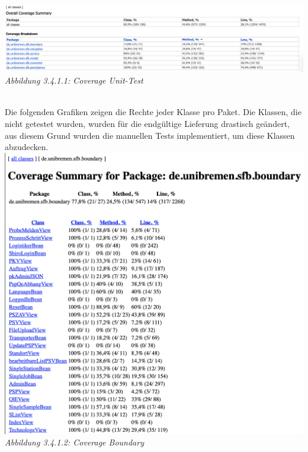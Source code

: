 \documentclass[enabledeprecatedfontcommands,fontsize=12pt,paper=a4,twoside]{scrartcl}
\begin{document}
 \hypertarget{sc3.4.1.1}{
\includegraphics[width=1\textwidth]{Screenshots/coverage.png}
\textit{Abbildung 3.4.1.1: Coverage Unit-Test}
} \\

Die folgenden Grafiken zeigen die Rechte jeder Klasse pro Paket. Die Klassen, die nicht getestet wurden, wurden für die endgültige Lieferung drastisch geändert, aus diesem Grund wurden die manuellen Tests implementiert, um diese Klassen abzudecken.
 \hypertarget{sc3.4.1.2}{
\includegraphics[width=1\textwidth]{Screenshots/boundary.png}
\textit{Abbildung 3.4.1.2: Coverage Boundary}
} \\
\end{document}
